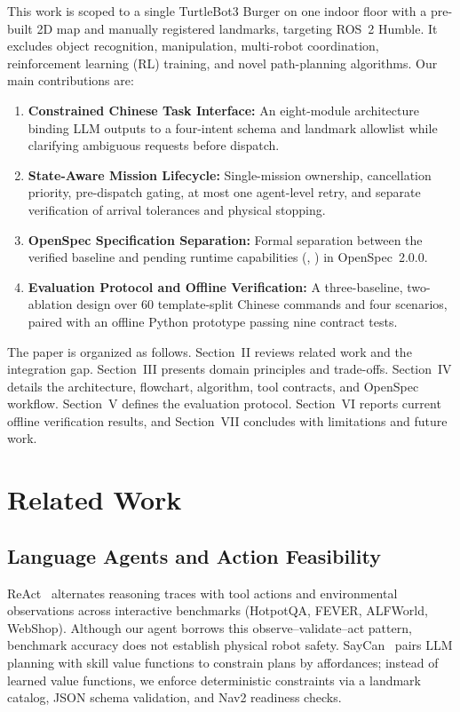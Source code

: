 \documentclass[conference,a4paper]{IEEEtran}
\begin{document}
This work is scoped to a single TurtleBot3 Burger on one indoor floor with a pre-built 2D map and manually registered landmarks, targeting ROS~2 Humble. It excludes object recognition, manipulation, multi-robot coordination, reinforcement learning (RL) training, and novel path-planning algorithms. Our main contributions are:
\begin{enumerate}
    \item \textbf{Constrained Chinese Task Interface:} An eight-module architecture binding LLM outputs to a four-intent schema and landmark allowlist while clarifying ambiguous requests before dispatch.
    \item \textbf{State-Aware Mission Lifecycle:} Single-mission ownership, cancellation priority, pre-dispatch gating, at most one agent-level retry, and separate verification of arrival tolerances and physical stopping.
    \item \textbf{OpenSpec Specification Separation:} Formal separation between the verified  baseline and pending runtime capabilities (, ) in OpenSpec~2.0.0.
    \item \textbf{Evaluation Protocol and Offline Verification:} A three-baseline, two-ablation design over 60 template-split Chinese commands and four scenarios, paired with an offline Python prototype passing nine contract tests.
\end{enumerate}

The paper is organized as follows. Section~II reviews related work and the integration gap. Section~III presents domain principles and trade-offs. Section~IV details the architecture, flowchart, algorithm, tool contracts, and OpenSpec workflow. Section~V defines the evaluation protocol. Section~VI reports current offline verification results, and Section~VII concludes with limitations and future work.

\section{Related Work}

\subsection{Language Agents and Action Feasibility}

ReAct~\cite{b1} alternates reasoning traces with tool actions and environmental observations across interactive benchmarks (HotpotQA, FEVER, ALFWorld, WebShop). Although our agent borrows this observe--validate--act pattern, benchmark accuracy does not establish physical robot safety. SayCan~\cite{b2} pairs LLM planning with skill value functions to constrain plans by affordances; instead of learned value functions, we enforce deterministic constraints via a landmark catalog, JSON schema validation, and Nav2 readiness checks.
\end{document}
